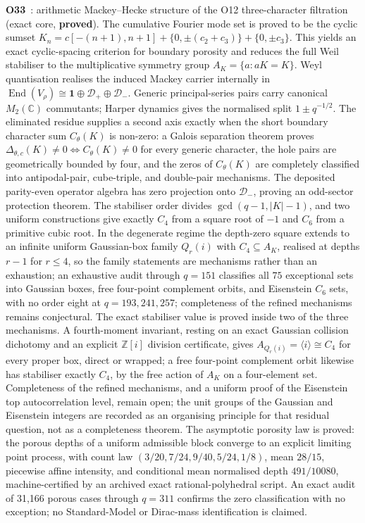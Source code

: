 \documentclass[11pt,a4paper]{article}
\newcommand{\sproved}{\textcolor{cproved}{\textbf{proved}}}
\begin{document}
    \textbf{O33}~\cite{Beau2026a37}: arithmetic Mackey--Hecke structure of the O12
    three-character filtration (exact core, \sproved).
    The cumulative Fourier mode set is proved to be the cyclic sumset
    $K_n=c[-(n+1),n+1]+\{0,\pm(c_2+c_3)\}+\{0,\pm c_3\}$.
    This yields an exact cyclic-spacing criterion for boundary porosity and reduces the full
    Weil stabiliser to the multiplicative symmetry group $A_K=\{a:aK=K\}$.
    Weyl quantisation realises the induced Mackey carrier internally in
    $\operatorname{End}(V_\rho)\cong\mathbf{1}\oplus\mathcal{D}_+\oplus\mathcal{D}_-$.
    Generic principal-series pairs carry canonical $M_2(\mathbb{C})$ commutants; Harper
    dynamics gives the normalised split $1\pm q^{-1/2}$.
    The eliminated residue supplies a second axis exactly when the short boundary character
    sum $C_\theta(K)$ is non-zero: a Galois separation theorem proves
    $\Delta_{\theta,c}(K)\ne0\iff C_\theta(K)\ne0$ for every generic character, the hole
    pairs are geometrically bounded by four, and the zeros of $C_\theta(K)$ are completely
    classified into antipodal-pair, cube-triple, and double-pair mechanisms.
    The deposited parity-even operator algebra has zero projection onto $\mathcal{D}_-$,
    proving an odd-sector protection theorem.
    The stabiliser order divides $\gcd(q-1,|K|-1)$, and two uniform constructions give
    exactly $C_4$ from a square root of $-1$ and $C_6$ from a primitive cubic root.
    In the degenerate regime the depth-zero square extends to an infinite uniform Gaussian-box
    family $Q_r(i)$ with $C_4\subseteq A_K$, realised at depths $r-1$ for $r\le4$, so the family
    statements are mechanisms rather than an exhaustion; an exhaustive audit through $q=151$ classifies all $75$
    exceptional sets
    into Gaussian boxes, free four-point complement orbits, and Eisenstein $C_6$ sets, with
    no order eight at $q=193,241,257$; completeness of the refined mechanisms remains
    conjectural.
    The exact stabiliser value is proved inside two of the three mechanisms.
    A fourth-moment invariant, resting on an exact Gaussian collision dichotomy and an
    explicit $\mathbb{Z}[i]$ division certificate, gives $A_{Q_r(i)}=\langle i\rangle\cong C_4$
    for every proper box, direct or wrapped; a free four-point complement orbit likewise has
    stabiliser exactly $C_4$, by the free action of $A_K$ on a four-element set.
    Completeness of the refined mechanisms, and a uniform proof of the Eisenstein top
    autocorrelation level, remain open; the unit groups of the Gaussian and Eisenstein
    integers are recorded as an organising principle for that residual question, not as a
    completeness theorem.
    The asymptotic porosity law is proved: the porous depths of a uniform
    admissible block converge to an explicit limiting point process, with count law
    $(3/20,7/24,9/40,5/24,1/8)$, mean $28/15$, piecewise affine intensity, and conditional
    mean normalised depth $491/10080$, machine-certified by an archived exact
    rational-polyhedral script.
    An exact audit of 31{,}166 porous cases through $q=311$ confirms the zero classification
    with no exception;
    no Standard-Model or Dirac-mass identification is claimed.
\end{document}

